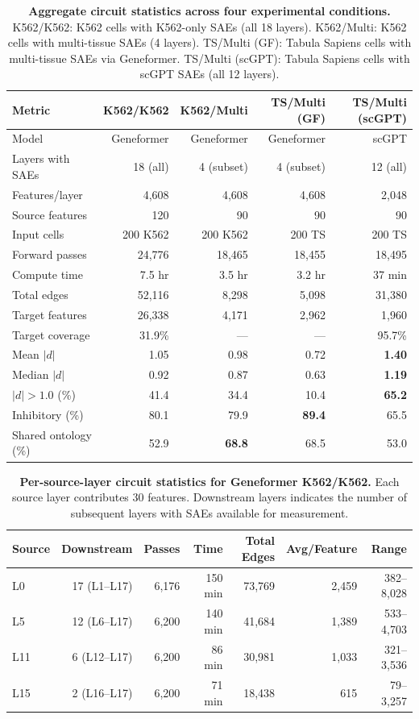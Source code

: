 \documentclass[onecolumn]{article}
\begin{document}
\begin{table}[t]
\centering
\caption{\textbf{Aggregate circuit statistics across four experimental conditions.} K562/K562: K562 cells with K562-only SAEs (all 18 layers). K562/Multi: K562 cells with multi-tissue SAEs (4 layers). TS/Multi (GF): Tabula Sapiens cells with multi-tissue SAEs via Geneformer. TS/Multi (scGPT): Tabula Sapiens cells with scGPT SAEs (all 12 layers).}
\label{tab:aggregate}
\smallskip
\begin{tabular}{lrrrr}
\toprule
Metric & K562/K562 & K562/Multi & TS/Multi (GF) & TS/Multi (scGPT) \\
\midrule
Model & Geneformer & Geneformer & Geneformer & scGPT \\
Layers with SAEs & 18 (all) & 4 (subset) & 4 (subset) & 12 (all) \\
Features/layer & 4,608 & 4,608 & 4,608 & 2,048 \\
Source features & 120 & 90 & 90 & 90 \\
Input cells & 200 K562 & 200 K562 & 200 TS & 200 TS \\
Forward passes & 24,776 & 18,465 & 18,455 & 18,495 \\
Compute time & 7.5 hr & 3.5 hr & 3.2 hr & 37 min \\
\midrule
Total edges & 52,116 & 8,298 & 5,098 & 31,380 \\
Target features & 26,338 & 4,171 & 2,962 & 1,960 \\
Target coverage & 31.9\% & --- & --- & 95.7\% \\
Mean $|d|$ & 1.05 & 0.98 & 0.72 & \textbf{1.40} \\
Median $|d|$ & 0.92 & 0.87 & 0.63 & \textbf{1.19} \\
$|d| > 1.0$ (\%) & 41.4 & 34.4 & 10.4 & \textbf{65.2} \\
Inhibitory (\%) & 80.1 & 79.9 & \textbf{89.4} & 65.5 \\
Shared ontology (\%) & 52.9 & \textbf{68.8} & 68.5 & 53.0 \\
\bottomrule
\end{tabular}
\end{table}


\begin{table}[t]
\centering
\caption{\textbf{Per-source-layer circuit statistics for Geneformer K562/K562.} Each source layer contributes 30 features. Downstream layers indicates the number of subsequent layers with SAEs available for measurement.}
\label{tab:perlayer}
\smallskip
\begin{tabular}{lrrrrrr}
\toprule
Source & Downstream & Passes & Time & Total Edges & Avg/Feature & Range \\
\midrule
L0 & 17 (L1--L17) & 6,176 & 150 min & 73,769 & 2,459 & 382--8,028 \\
L5 & 12 (L6--L17) & 6,200 & 140 min & 41,684 & 1,389 & 533--4,703 \\
L11 & 6 (L12--L17) & 6,200 & 86 min & 30,981 & 1,033 & 321--3,536 \\
L15 & 2 (L16--L17) & 6,200 & 71 min & 18,438 & 615 & 79--3,257 \\
\bottomrule
\end{tabular}
\end{table}
\end{document}
